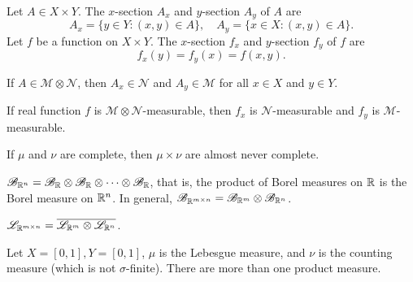 \documentclass[class=book, crop=false]{standalone}
\begin{document}
        \begin{definition}[Section]
            Let $A \in X \times Y$. The $x$-section $A_x$ and $y$-section $A_y$ of $A$ are
            \begin{equation*}
                A_x = \{y \in Y : (x, y) \in A\}, \quad A_y = \{x \in X : (x, y) \in A\}.
            \end{equation*}
            Let $f$ be a function on $X \times Y$. The $x$-section $f_x$ and $y$-section $f_y$ of $f$ are
            \begin{equation*}
                f_x(y) = f_y(x) = f(x, y).
            \end{equation*}
        \end{definition}

        \begin{theorem}
            If $A \in \mathscr{M} \otimes \mathscr{N}$, then $A_x \in \mathscr{N}$ and $A_y \in \mathscr{M}$ for all $x \in X$ and $y \in Y$.
        \end{theorem}

        \begin{theorem}
            If real function $f$ is $\mathscr{M} \otimes \mathscr{N}$-measurable, then $f_x$ is $\mathscr{N}$-measurable and $f_y$ is $\mathscr{M}$-measurable.
        \end{theorem}

        \begin{theorem}
            If $\mu$ and $\nu$ are complete, then $\mu \times \nu$ are almost never complete.
        \end{theorem}

        \begin{theorem}
            $\mathscr{B}_{\mathbb{R}^n} = \mathscr{B}_{\mathbb{R}} \otimes \mathscr{B}_{\mathbb{R}} \otimes \cdots \otimes \mathscr{B}_{\mathbb{R}}$, that is, the product of Borel measures on $\mathbb{R}$ is the Borel measure on $\mathbb{R}^n$. In general, $\mathscr{B}_{\mathbb{R}^{m \times n}} = \mathscr{B}_{\mathbb{R}^m} \otimes \mathscr{B}_{\mathbb{R}^n}$.
        \end{theorem}

        \begin{theorem}
            $\mathscr{L}_{\mathbb{R}^{m \times n}} = \overline{\mathscr{L}_{\mathbb{R}^m} \otimes \mathscr{L}_{\mathbb{R}^n}}$.
        \end{theorem}

        \begin{theorem}
            Let $X = [0, 1], Y = [0, 1]$, $\mu$ is the Lebesgue measure, and $\nu$ is the counting measure (which is not $\sigma$-finite). There are more than one product measure.
        \end{theorem}
\end{document}
